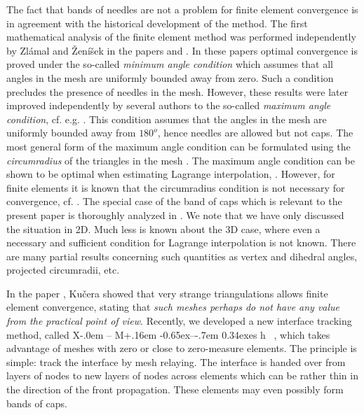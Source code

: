 \documentclass{article}
\makeatletter
\newcommand\xm{%
  X\kern-.0em%
  --%
   \hbox{M}\kern+.16em%
   \raise-0.65ex\hbox{--}\kern-.7em%
  \raise0.34ex\hbox{es}%
  \hbox{{h}}%
\@}
\theoremstyle{remark}
\makeatother
\begin{document}
The fact that bands of needles are not a problem for finite element convergence is in agreement with the historical development of the method. The first mathematical analysis of the finite element method was performed independently by Zl\'{a}mal and \v{Z}en\'{i}\v{s}ek in the papers \cite{Zlamal} and \cite{Zenisek}. In these papers optimal convergence is proved under the so-called \emph{minimum angle condition} which assumes that all angles in the mesh are uniformly bounded away from zero. Such a condition precludes the presence of needles in the mesh. However, these results were later improved independently by several authors to the so-called \emph{maximum angle condition}, cf. e.g. \cite{babuvska1976angle}. This condition assumes that the angles in the mesh are uniformly bounded away from $180^o$, hence needles are allowed but not caps. The most general form of the maximum angle condition can be formulated using the \emph{circumradius} of the triangles in the mesh \cite{kobayashi2015circumradius}. The maximum angle condition can be shown to be optimal when estimating Lagrange interpolation, \cite{Kucera_circumradius}. However, for finite elements it is known that the circumradius condition is not necessary for convergence, cf. \cite{hannukainen2012maximum}. The special case of the band of caps which is relevant to the present paper is thoroughly analyzed in \cite{kuvcera2016necessary}. We note that we have only discussed the situation in 2D. Much less is known about the 3D case, where even a necessary and sufficient condition for Lagrange interpolation is not known. There are many partial results concerning such quantities as vertex and dihedral angles, projected circumradii, etc.

In the paper \cite{kuvcera2016necessary}, Ku{\v{c}}era showed that very strange triangulations allows finite element convergence, stating that \emph{such meshes perhaps do not have any value from the practical point
  of view}.
Recently, we developed a new interface tracking method, called \xm\, \cite{degrooff2024simulation,moes2023extreme,quiriny2024x}, which takes advantage of meshes with zero or close to zero-measure elements. The principle is simple: track the interface by mesh relaying. The interface is handed over from layers of nodes to new layers of nodes across elements which can be rather thin in the direction of the front propagation. These elements may even possibly form bands of caps. 
\end{document}
